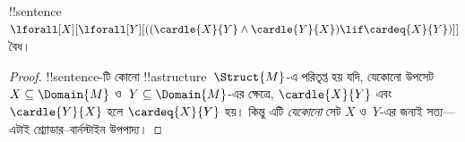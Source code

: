 \documentclass[../../../include/open-logic-section]{subfiles}
\begin{document}
\begin{prop}
!!{sentence}~$\lforall[X][\lforall[Y][((\cardle{X}{Y} \land
    \cardle{Y}{X}) \lif \cardeq{X}{Y})]]$ বৈধ।
\end{prop}

\begin{proof}
!!{sentence}-টি কোনো !!a{structure}~$\Struct{M}$-এ পরিতৃপ্ত হয় যদি,
যেকোনো উপসেট $X \subseteq \Domain{M}$ ও~$Y \subseteq \Domain{M}$-এর
ক্ষেত্রে, $\cardle{X}{Y}$ এবং $\cardle{Y}{X}$ হলে
$\cardeq{X}{Y}$ হয়। কিন্তু এটি \emph{যেকোনো} সেট $X$ ও~$Y$-এর জন্যই
সত্য---এটাই শ্র্যোডার--বার্নস্টাইন উপপাদ্য।
\end{proof}
\end{document}
